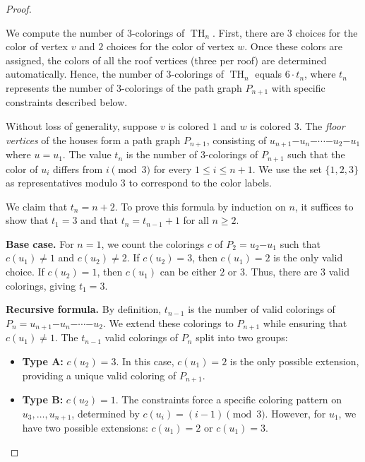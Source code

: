 \documentclass{amsart}
\theoremstyle{hypothesisstyle}
\theoremstyle{definition}
\theoremstyle{remark}
\numberwithin{equation}{section}
\begin{document}
\begin{proof}
\begin{center}
\end{center}

We compute the number of $3$-colorings of $\operatorname{TH}_{n}$. First, there are $3$ choices for the color of vertex $v$ and $2$ choices for the color of vertex $w$. Once these colors are assigned, the colors of all the roof vertices (three per roof) are determined automatically. Hence, the number of $3$-colorings of $\operatorname{TH}_{n}$ equals $6 \cdot t_n$, where $t_n$ represents the number of $3$-colorings of the path graph $P_{n+1}$ with specific constraints described below.

Without loss of generality, suppose $v$ is colored $1$ and $w$ is colored $3$. The \emph{floor vertices} of the houses form a path graph $P_{n+1}$, consisting of $u_{n+1} \mathord{-} u_{n} \mathord{-} \cdots \mathord{-} u_2 \mathord{-} u_1$ where $u=u_1$. The value $t_n$ is the number of $3$-colorings of $P_{n+1}$ such that the color of $u_i$ differs from $i \pmod{3}$ for every $1 \leq i \leq n+1$. We use the set $\{1, 2, 3\}$ as representatives modulo $3$ to correspond to the color labels.

We claim that $t_n = n+2$. To prove this formula by induction on $n$, it suffices to show that $t_1 = 3$ and that $t_n = t_{n-1} + 1$ for all $n \geq 2$.

\textbf{Base case.} For $n = 1$, we count the colorings $c$ of $P_2 = u_2 \mathord{-} u_1$ such that $c(u_1) \neq 1$ and $c(u_2) \neq 2$. If $c(u_2) = 3$, then $c(u_1) = 2$ is the only valid choice. If $c(u_2) = 1$, then $c(u_1)$ can be either $2$ or $3$. Thus, there are $3$ valid colorings, giving $t_1 = 3$.
  
\textbf{Recursive formula.} By definition, $t_{n-1}$ is the number of valid colorings of $P_n = u_{n+1} \mathord{-} u_n \mathord{-} \cdots \mathord{-} u_2$. We extend these colorings to $P_{n+1}$ while ensuring that $c(u_1) \neq 1$. The $t_{n-1}$ valid colorings of $P_n$ split into two groups:

\begin{itemize}
    \item \textbf{Type A:} $c(u_2) = 3$. In this case, $c(u_1) = 2$ is the only possible extension, providing a unique valid coloring of $P_{n+1}$. 
    \item \textbf{Type B:} $c(u_2) = 1$. The constraints force a specific coloring pattern on $u_3, \dots, u_{n+1}$, determined by $c(u_i) = (i-1) \pmod{3}$. However, for $u_1$, we have two possible extensions: $c(u_1) = 2$ or $c(u_1) = 3$.
\end{itemize}


\end{proof}
\end{document}
